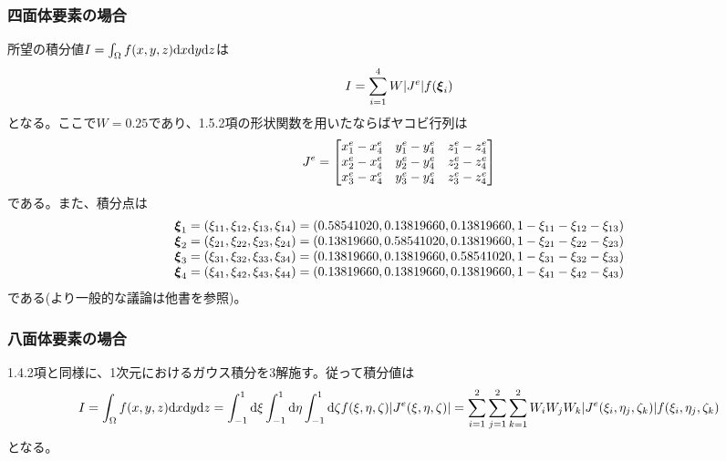 \documentclass[dvipdfmx, 9pt, a4paper]{jsarticle}
\numberwithin{equation}{section}
\newcommand{\bm}[1]{{\mbox{\boldmath $#1$}}}
\begin{document}
\subsubsection{四面体要素の場合}
所望の積分値$I=\int_{\Omega}f(x, y, z){\rm d}x{\rm d}y{\rm d}z$は
\begin{equation}
I=\sum_{i=1}^4 W|J^e|f(\bm \xi_i)
\end{equation}
となる。ここで$W=0.25$であり、1.5.2項の形状関数を用いたならばヤコビ行列は
\begin{equation}
J^e=
\begin{bmatrix}
x^e_1 - x^e_4 & y^e_1 - y^e_4 & z^e_1 - z^e_4 \\
x^e_2 - x^e_4 & y^e_2 - y^e_4 & z^e_2 - z^e_4 \\
x^e_3 - x^e_4 & y^e_3 - y^e_4 & z^e_3 - z^e_4 \\
\end{bmatrix} \notag
\end{equation}
である。また、積分点は
\begin{equation}
\begin{array}{l}
\bm \xi_1 = (\xi_{11}, \xi_{12}, \xi_{13}, \xi_{14})=(0.58541020, 0.13819660, 0.13819660, 1 - \xi_{11}-\xi_{12}-\xi_{13}) \\
\bm \xi_2 = (\xi_{21}, \xi_{22}, \xi_{23}, \xi_{24})=(0.13819660, 0.58541020, 0.13819660, 1 - \xi_{21}-\xi_{22}-\xi_{23}) \\
\bm \xi_3 = (\xi_{31}, \xi_{32}, \xi_{33}, \xi_{34})=(0.13819660, 0.13819660, 0.58541020, 1 - \xi_{31}-\xi_{32}-\xi_{33}) \\
\bm \xi_4 = (\xi_{41}, \xi_{42}, \xi_{43}, \xi_{44})=(0.13819660, 0.13819660, 0.13819660, 1 - \xi_{41}-\xi_{42}-\xi_{43}) \\
\end{array}
\end{equation}
である(より一般的な議論は他書を参照)。

\subsubsection{八面体要素の場合}
1.4.2項と同様に、1次元におけるガウス積分を3解施す。従って積分値は
\begin{equation}
I=\int_\Omega f(x, y, z){\rm d}x{\rm d}y{\rm d}z=\int_{-1}^1{\rm d}\xi\int_{-1}^1{\rm d}\eta\int_{-1}^1{\rm d}\zeta f(\xi, \eta, \zeta)|J^e(\xi, \eta, \zeta)|=\sum_{i=1}^2\sum_{j=1}^2\sum_{k=1}^2W_iW_jW_k|J^e(\xi_i, \eta_j, \zeta_k)|f(\xi_i, \eta_j, \zeta_k)
\end{equation}
となる。
\end{document}
